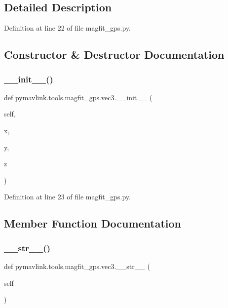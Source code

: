 \subsection{Detailed Description}


Definition at line 22 of file magfit\+\_\+gps.\+py.



\subsection{Constructor \& Destructor Documentation}
\mbox{\label{classpymavlink_1_1tools_1_1magfit__gps_1_1vec3_a3302b13d06f07834294c0a4e978808de}} 
\subsubsection{\texorpdfstring{\_\_init\_\_()}{\_\_init\_\_()}}
{\footnotesize\ttfamily def pymavlink.\+tools.\+magfit\+\_\+gps.\+vec3.\+\_\+\+\_\+init\+\_\+\+\_\+ (\begin{DoxyParamCaption}\item[{}]{self,  }\item[{}]{x,  }\item[{}]{y,  }\item[{}]{z }\end{DoxyParamCaption})}



Definition at line 23 of file magfit\+\_\+gps.\+py.



\subsection{Member Function Documentation}
\mbox{\label{classpymavlink_1_1tools_1_1magfit__gps_1_1vec3_aa1a57c61eadfd5a3996c4ddb923f23ef}} 
\subsubsection{\texorpdfstring{\_\_str\_\_()}{\_\_str\_\_()}}
{\footnotesize\ttfamily def pymavlink.\+tools.\+magfit\+\_\+gps.\+vec3.\+\_\+\+\_\+str\+\_\+\+\_\+ (\begin{DoxyParamCaption}\item[{}]{self }\end{DoxyParamCaption})}



